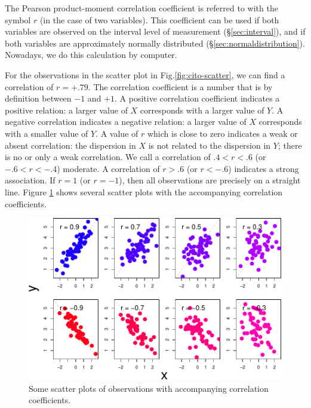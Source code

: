 \documentclass[
]{book}
\begin{document}
The Pearson product-moment correlation coefficient is referred to with
the symbol \(r\) (in the case of two variables). This coefficient can be
used if both variables are observed on the interval level of measurement
(§\ref{sec:interval}), and if both variables are approximately
normally distributed
(§\ref{sec:normaldistribution}). Nowadays, we do this calculation
by computer.

For the observations in the scatter plot in
Fig.\ref{fig:cito-scatter}, we can find a correlation of \(r=+.79\). The
correlation coefficient is a number that is by definition between \(-1\)
and \(+1\). A positive correlation coefficient indicates a positive relation:
a larger value of \(X\) corresponds with a larger value
of \(Y\). A negative correlation indicates a negative relation:
a larger value of \(X\) corresponds with a smaller value of
\(Y\). A value of \(r\) which is close to zero indicates a weak
or absent correlation: the dispersion in \(X\) is not related to the
dispersion in \(Y\); there is no or only a weak correlation. We call a correlation of
\(.4<r<.6\) (or \(-.6 < r < -.4\)) moderate. A correlation of
\(r>.6\) (or \(r< -.6\)) indicates a strong association. If \(r=1\) (or
\(r=-1\)), then all observations are precisely on a straight line.
Figure \ref{fig:cor-scatter} shows several scatter plots with the
accompanying correlation coefficients.

\begin{figure}

{\centering \includegraphics{QMS-EN_files/figure-latex/cor-scatter-1} 

}

\caption{Some scatter plots of observations with accompanying correlation coefficients.}\label{fig:cor-scatter}
\end{figure}
\end{document}
